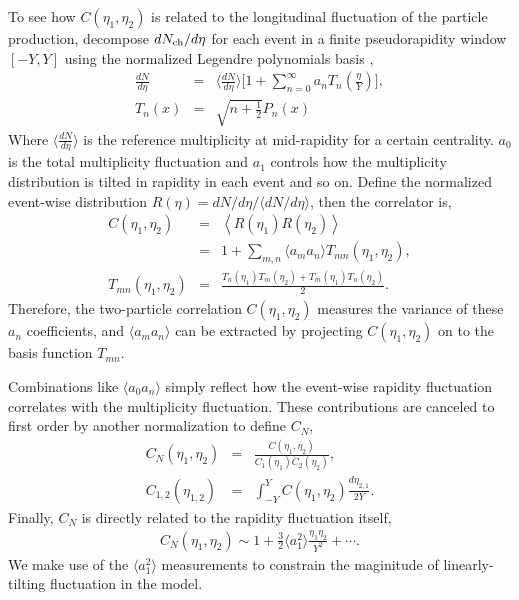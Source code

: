 To see how $C(\eta_1, \eta_2)$ is related to the longitudinal fluctuation of the particle production, decompose $dN_\text{ch}/d\eta$ for each event in a finite pseudorapidity window $[-Y, Y]$ using the normalized Legendre polynomials basis \cite{Bzdak:2012tp, Jia:2015jga, ATLAS:2015kla},
\begin{eqnarray}
\frac{dN}{d\eta} &=& \biggl\langle\frac{dN}{d\eta}\biggr\rangle \biggl[1 + \sum_{n=0}^\infty a_n T_n\left(\frac{\eta}{Y}\right) \biggr],\\
T_n(x) &=& \sqrt{n + \frac{1}{2}} P_n(x)
\end{eqnarray}
Where $\langle\frac{dN}{d\eta}\rangle$ is the reference multiplicity at mid-rapidity for a certain centrality.
$a_0$ is the total multiplicity fluctuation and $a_1$ controls how the multiplicity distribution is tilted in rapidity in each event and so on.
Define the normalized event-wise distribution $R(\eta) = dN/d\eta /\langle dN/d\eta\rangle$, then the correlator is,
\begin{eqnarray}
C(\eta_1, \eta_2) &=& \left\langle R(\eta_1) R(\eta_2)\right\rangle \\
&=& 1 + \sum_{m, n}\langle a_m a_n\rangle  T_{mn}(\eta_1, \eta_2),\\
T_{mn}(\eta_1, \eta_2) &=& \frac{T_n(\eta_1)T_m(\eta_2) + T_m(\eta_1)T_n(\eta_2)}{2}.
\end{eqnarray}
Therefore, the two-particle correlation $C(\eta_1, \eta_2)$ measures the variance of these $a_n$ coefficients, and $\langle a_m a_n\rangle$ can be extracted by projecting $C(\eta_1, \eta_2)$ on to the basis function $T_{mn}$.

Combinations like $\langle a_0 a_n\rangle$ simply reflect how the event-wise rapidity fluctuation correlates with the multiplicity fluctuation. 
These contributions are canceled to first order by another normalization to define $C_N$,
\begin{eqnarray}
 C_N(\eta_1, \eta_2) &=& \frac{C(\eta_1, \eta_2)}{C_1(\eta_1)C_2(\eta_2)},\\
C_{1,2}(\eta_{1,2}) &=& \int_{-Y}^{Y}C(\eta_1, \eta_2)\frac{d\eta_{2,1}}{2Y}.
\end{eqnarray}
Finally, $C_N$ is directly related to the rapidity fluctuation itself,
\begin{eqnarray}
C_N(\eta_1, \eta_2) \sim 1 + \frac{3}{2}\langle a_1 ^2 \rangle \frac{\eta_1\eta_2}{Y^2} + \cdots.
\end{eqnarray}
We make use of the $\langle a_1 ^2 \rangle$ measurements to constrain the maginitude of linearly-tilting fluctuation in the model.

